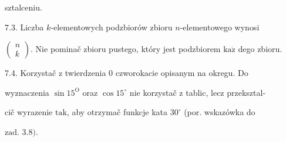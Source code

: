 \documentclass[a4paper,12pt]{article}
\begin{document}
sztalceniu.

7.3. Liczba $k$-elementowych podzbiorów zbioru $n$-elementowego wynosi

$\left(\begin{array}{l}
n\\
k
\end{array}\right)$. Nie pominač zbioru pustego, który jest podzbiorem $\mathrm{k}\mathrm{a}\dot{\mathrm{z}}$ dego zbioru.

7.4. Korzystač $\mathrm{z}$ twierdzenia $0$ czworokacie opisanym na okregu. Do

wyznaczenia $\sin 15^{\mathrm{O}}$ oraz $\cos 15^{\circ}$ nie korzystač $\mathrm{z}$ tablic, lecz przeksztal-

cič wyrazenie $\mathrm{t}\mathrm{a}\mathrm{k}$, aby otrzymač funkcje kata $30^{\circ}$ (por. wskazówka do

$\mathrm{z}\mathrm{a}\mathrm{d}$. 3.8$).$
\end{document}
